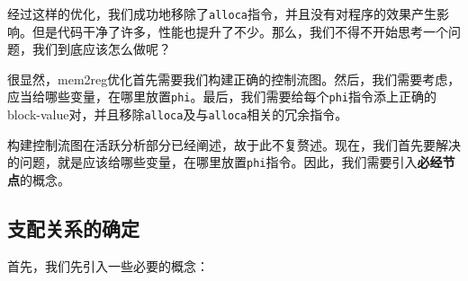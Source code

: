 经过这样的优化，我们成功地移除了\texttt{alloca}指令，并且没有对程序的效果产生影响。但是代码干净了许多，性能也提升了不少。那么，我们不得不开始思考一个问题，我们到底应该怎么做呢？

很显然，mem2reg优化首先需要我们构建正确的控制流图。然后，我们需要考虑，应当给哪些变量，在哪里放置\texttt{phi}。最后，我们需要给每个\texttt{phi}指令添上正确的block-value对，并且移除\texttt{alloca}及与\texttt{alloca}相关的冗余指令。

构建控制流图在活跃分析部分已经阐述，故于此不复赘述。现在，我们首先要解决的问题，就是应该给哪些变量，在哪里放置\texttt{phi}指令。因此，我们需要引入\textbf{必经节点}的概念。

\subsection{支配关系的确定}

首先，我们先引入一些必要的概念：

